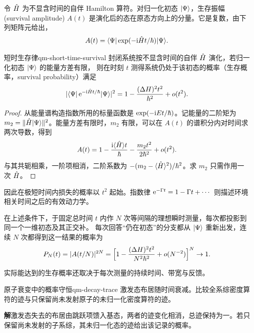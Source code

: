 令 $\hat{H}$ 为不显含时间的自伴 Hamilton 算符。对归一化初态 $\lvert\Psi\rangle$，生存振幅(survival amplitude) $A(t)$ 是演化后的态在原态方向上的分量。它是复数，由下列矩阵元给出，
\begin{equation}\label{eq:qm-survival-amplitude}
    A(t) = \langle\Psi\vert\exp(-\mathrm{i} \hat{H}t/\hbar)\vert\Psi\rangle.
\end{equation}
\begin{theorem}{短时生存律}{qm-short-time-survival}
    封闭系统按不显含时间的自伴 $\hat{H}$ 演化，若归一化初态 $\lvert\Psi\rangle$ 的能量方差有限，
    则在时刻 $t$ 测得系统仍处于该初态的概率（生存概率，survival probability）满足
    \begin{equation}
        \lvert\langle\Psi\vert\mathop{}\!\mathrm{e}^{-\mathrm{i} \hat{H}t/\hbar}\vert\Psi\rangle\rvert^2
        = 1 - \frac{(\Delta H)^2t^2}{\hbar^2} + o(t^2).
    \end{equation}
\end{theorem}
\begin{proof}
    从能量谱构造指数所用的标量函数是 $\exp(-\mathrm{i} Et/\hbar)$。记能量的二阶矩为 $m_2 = \lVert\hat{H}\lvert\Psi\rangle\rVert^2$。能量方差有限时，$m_2$ 有限，可以在 $A(t)$ 的谱积分内对时间求两次导数，得到
    \begin{equation}
        A(t) = 1 - \frac{\mathrm{i}\langle\hat{H}\rangle t}{\hbar}
        - \frac{m_2t^2}{2\hbar^2} + o(t^2).
    \end{equation}
    与其共轭相乘，一阶项相消，二阶系数为 $-(m_2 - \langle\hat{H}\rangle^2)/\hbar^2$。求 $m_2$ 只需作用一次 $\hat{H}$。
\end{proof}
因此在极短时间内损失的概率以 $t^2$ 起始。指数律 $\mathop{}\!\mathrm{e}^{-\Gamma t} = 1 - \Gamma t + \cdots$ 则描述环境相关时间之后的有效动力学。
\begin{corollary}
在上述条件下，于固定总时间 $t$ 内作 $N$ 次等间隔的理想瞬时测量，每次都投影到同一个一维初态及其正交补。
每次回答“仍在初态”的分支都从 $\lvert\Psi\rangle$ 重新出发，连续 $N$ 次都得到这一结果的概率为
\begin{equation}
    P_N(t) = \lvert A(t/N)\rvert^{2N}
        = \Bigl[1 - \frac{(\Delta H)^2t^2}{N^2\hbar^2} + o(N^{-2})\Bigr]^N \to 1.
\end{equation}
\end{corollary}
实际能达到的生存概率还取决于每次测量的持续时间、带宽与反馈。

\begin{example}{原子衰变中的概率守恒}{qm-decay-trace}
    激发态布居随时间衰减。比较全系综密度算符的迹与只保留尚未发射原子的未归一化密度算符的迹。

    \par\smallskip\textbf{解}\quad 激发态失去的布居由跳跃项馈入基态，两者的迹变化相消，总迹保持为一。若只保留尚未发射的子系综，其未归一化态的迹给出该记录的概率。
\end{example}
